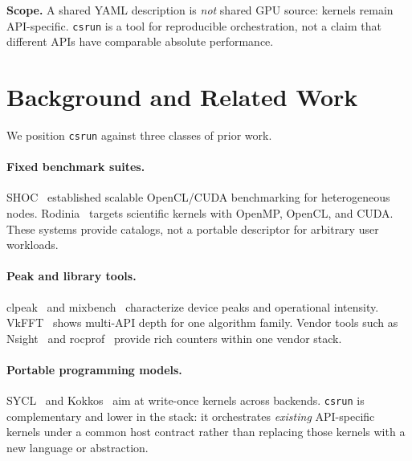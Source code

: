 \documentclass[11pt,a4paper]{article}
\newcommand{\csrun}{\texttt{csrun}\xspace}
\begin{document}
\noindent
\textbf{Scope.} A shared YAML description is \emph{not} shared GPU source:
kernels remain API-specific. \csrun is a tool for reproducible orchestration,
not a claim that different APIs have comparable absolute performance.
\FloatBarrier

\section{Background and Related Work}
\label{sec:related}

We position \csrun against three classes of prior work.

\paragraph{Fixed benchmark suites.}
SHOC~\cite{danalis2010shoc} established scalable OpenCL/CUDA benchmarking for
heterogeneous nodes. Rodinia~\cite{che2009rodinia} targets scientific kernels
with OpenMP, OpenCL, and CUDA. These systems provide catalogs, not a portable
descriptor for arbitrary user workloads.

\paragraph{Peak and library tools.}
clpeak~\cite{clpeak2026} and mixbench~\cite{konstantinidis2015mixbench}
characterize device peaks and operational intensity. VkFFT~\cite{vkfft2021}
shows multi-API depth for one algorithm family. Vendor tools such as
Nsight~\cite{nsight} and rocprof~\cite{rocprof} provide rich counters within
one vendor stack.

\paragraph{Portable programming models.}
SYCL~\cite{sycl2020} and Kokkos~\cite{trott2022kokkos} aim at write-once
kernels across backends. \csrun is complementary and lower in the stack: it
orchestrates \emph{existing} API-specific kernels under a common host contract
rather than replacing those kernels with a new language or abstraction.
\end{document}
